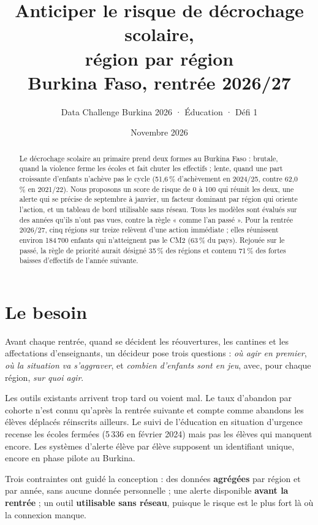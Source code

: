 \documentclass[11pt,a4paper]{article}
\title{\textbf{Anticiper le risque de décrochage scolaire,\\ région par région}\\[4pt]\large Burkina Faso, rentrée 2026/27}
\author{Data Challenge Burkina 2026 · Éducation · Défi 1}
\date{Novembre 2026}
\begin{document}
\maketitle

\begin{abstract}
\noindent Le décrochage scolaire au primaire prend deux formes au Burkina Faso : brutale, quand la violence ferme les écoles et fait chuter les effectifs ; lente, quand une part croissante d'enfants n'achève pas le cycle (51,6\,\% d'achèvement en 2024/25, contre 62,0\,\% en 2021/22). Nous proposons un score de risque de 0 à 100 qui réunit les deux, une alerte qui se précise de septembre à janvier, un facteur dominant par région qui oriente l'action, et un tableau de bord utilisable sans réseau. Tous les modèles sont évalués sur des années qu'ils n'ont pas vues, contre la règle « comme l'an passé ». Pour la rentrée 2026/27, cinq régions sur treize relèvent d'une action immédiate ; elles réunissent environ 184\,700 enfants qui n'atteignent pas le CM2 (63\,\% du pays). Rejouée sur le passé, la règle de priorité aurait désigné 35\,\% des régions et contenu 71\,\% des fortes baisses d'effectifs de l'année suivante.
\end{abstract}

\section{Le besoin}
Avant chaque rentrée, quand se décident les réouvertures, les cantines et les affectations d'enseignants, un décideur pose trois questions : \emph{où agir en premier}, \emph{où la situation va s'aggraver}, et \emph{combien d'enfants sont en jeu}, avec, pour chaque région, \emph{sur quoi agir}.

Les outils existants arrivent trop tard ou voient mal. Le taux d'abandon par cohorte n'est connu qu'après la rentrée suivante et compte comme abandons les élèves déplacés réinscrits ailleurs. Le suivi de l'éducation en situation d'urgence recense les écoles fermées (5\,336 en février 2024) mais pas les élèves qui manquent encore. Les systèmes d'alerte élève par élève supposent un identifiant unique, encore en phase pilote au Burkina.

Trois contraintes ont guidé la conception : des données \textbf{agrégées} par région et par année, sans aucune donnée personnelle ; une alerte disponible \textbf{avant la rentrée} ; un outil \textbf{utilisable sans réseau}, puisque le risque est le plus fort là où la connexion manque.
\end{document}
